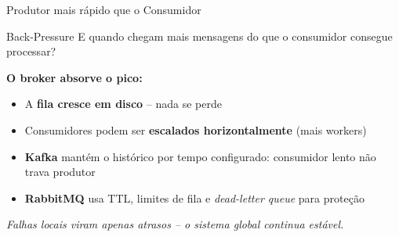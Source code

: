 \documentclass[10pt,aspectratio=169]{beamer}
\begin{document}
\begin{frame}{Produtor mais rápido que o Consumidor}
    \begin{alertblock}{Back-Pressure}
        E quando chegam mais mensagens do que o consumidor consegue processar?
    \end{alertblock}

    \vspace{0.2cm}
    \textbf{O broker absorve o pico:}
    \begin{itemize}
        \item A \textbf{fila cresce em disco} -- nada se perde
        \item Consumidores podem ser \textbf{escalados horizontalmente} (mais workers)
        \item \textbf{Kafka} mantém o histórico por tempo configurado: consumidor lento não trava produtor
        \item \textbf{RabbitMQ} usa TTL, limites de fila e \emph{dead-letter queue} para proteção
    \end{itemize}

    \vspace{0.2cm}
    \centering\textit{Falhas locais viram apenas atrasos -- o sistema global continua estável.}
\end{frame}
\end{document}
